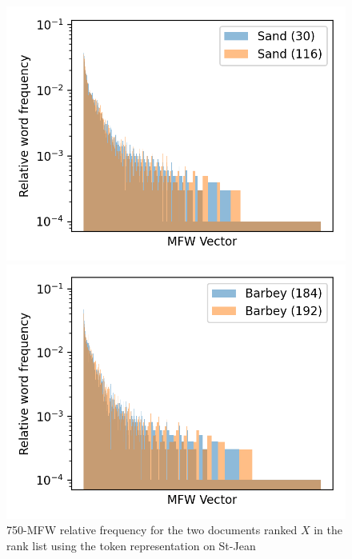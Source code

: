 \begin{figure}
  \centering
  \caption{750-MFW relative frequency for the two documents ranked $X$ in the rank list using the token representation on St-Jean}

  \label{fig:mfw_vector_first_rl}
  \includegraphics[width=\linewidth]{img/mfw_vector_first_rl.png}

  \vspace{0.5cm}

  \label{fig:mfw_vector_first_last_rl}
  \includegraphics[width=\linewidth]{img/mfw_vector_first_last_rl.png}

  \vspace{0.5cm}


\end{figure}

